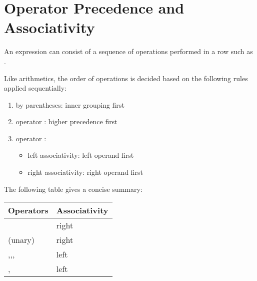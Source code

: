 \documentclass[letterpaper,10pt,english]{sphinxmanual}
\begin{document}
\section{Operator Precedence and Associativity}
\label{\detokenize{Lecture2/Expressions and Arithmetic:operator-precedence-and-associativity}}
An expression can consist of a sequence of operations performed in a row such as .


Like arithmetics, the order of operations is decided based on the following rules applied sequentially:
\begin{enumerate}
%
\item {} 
 by parentheses: inner grouping first

\item {} 
operator : higher precedence first

\item {} 
operator :
\begin{itemize}
\item {} 
left associativity: left operand first

\item {} 
right associativity: right operand first

\end{itemize}

\end{enumerate}


The following table gives a concise summary:


\begin{savenotes}\sphinxattablestart
\centering
\begin{tabulary}{\linewidth}[t]{|T|T|}
\hline
\sphinxstyletheadfamily 
Operators
&\sphinxstyletheadfamily 
Associativity
\\
\hline
\sphinxcode{\sphinxupquote{**}}
&
right
\\
\hline
\sphinxcode{\sphinxupquote{\sphinxhyphen{}}} (unary)
&
right
\\
\hline
\sphinxcode{\sphinxupquote{*}},\sphinxcode{\sphinxupquote{/}},\sphinxcode{\sphinxupquote{//}},\sphinxcode{\sphinxupquote{\%}}
&
left
\\
\hline
\sphinxcode{\sphinxupquote{+}},\sphinxcode{\sphinxupquote{\sphinxhyphen{}}}
&
left
\\
\hline
\end{tabulary}
\par
\sphinxattableend\end{savenotes}
\end{document}
